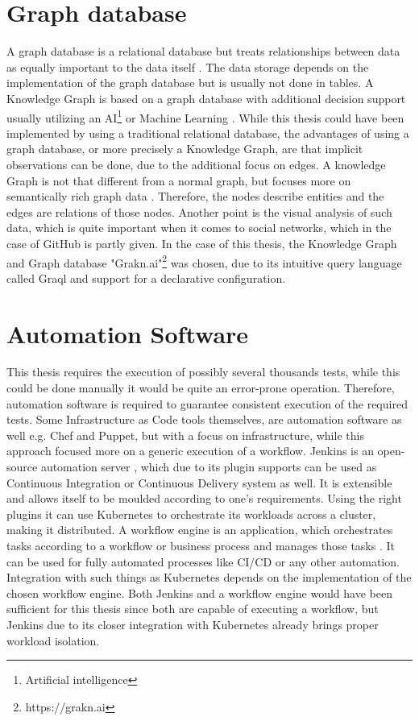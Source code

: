 \section{Graph database}
\label{sec:background-graph}
A graph database is a relational database but treats relationships between data as equally important to the data itself \cite{graphdb}. The data storage depends on the implementation of the graph database but is usually not done in tables.
A Knowledge Graph is based on a graph database with additional decision support usually utilizing an AI\footnote{Artificial intelligence} or Machine Learning \cite{knowledgegraph}. While this thesis could have been implemented by using a traditional relational database, the advantages of using a graph database, or more precisely a Knowledge Graph, are that implicit observations can be done, due to the additional focus on edges. A knowledge Graph is not that different from a normal graph, but focuses more on semantically rich graph data \cite{graknKnowledge}. Therefore, the nodes describe entities and the edges are relations of those nodes. Another point is the visual analysis of such data, which is quite important when it comes to social networks, which in the case of GitHub is partly given.
In the case of this thesis, the Knowledge Graph and Graph database "Grakn.ai"\footnote{https://grakn.ai} was chosen, due to its intuitive query language called Graql and support for a declarative configuration.

\section{Automation Software}
\label{sec:background-automation}
This thesis requires the execution of possibly several thousands tests, while this could be done manually it would be quite an error-prone operation. Therefore, automation software is required to guarantee consistent execution of the required tests. Some Infrastructure as Code tools themselves, are automation software as well e.g. Chef and Puppet, but with a focus on infrastructure, while this approach focused more on a generic execution of a workflow.
Jenkins is an open-source automation server \cite{jenkins}, which due to its plugin supports can be used as Continuous Integration or Continuous Delivery system as well. It is extensible and allows itself to be moulded according to one's requirements. Using the right plugins it can use Kubernetes to orchestrate its workloads across a cluster, making it distributed.
A workflow engine is an application, which orchestrates tasks according to a workflow or business process and manages those tasks \cite{workflow}. It can be used for fully automated processes like CI/CD or any other automation. Integration with such things as Kubernetes depends on the implementation of the chosen workflow engine.
Both Jenkins and a workflow engine would have been sufficient for this thesis since both are capable of executing a workflow, but Jenkins due to its closer integration with Kubernetes already brings proper workload isolation.

